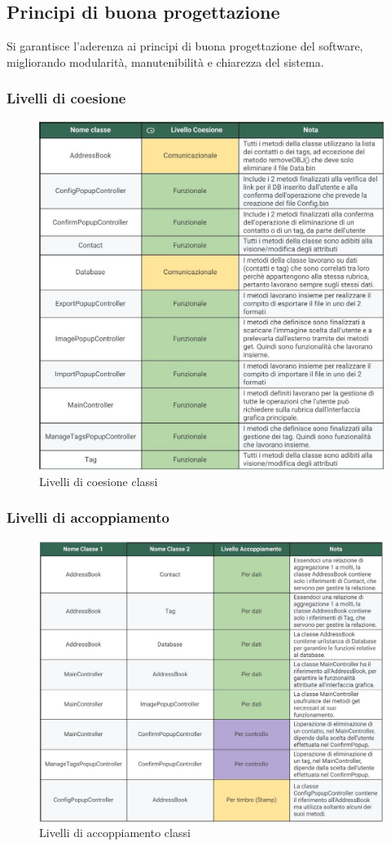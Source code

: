 \newpage
\subsection{Principi di buona progettazione}
Si garantisce l'aderenza ai principi di buona progettazione del software, migliorando modularità, manutenibilità e chiarezza del sistema.
\subsubsection{Livelli di coesione}
\begin{figure}[h]
	\centering
	\includegraphics[width=.9\linewidth]{images/Coesione classi.jpg}
	\caption{Livelli di coesione classi}
	\label{fig:livelli di coesione classi}
\end{figure}
\newpage
\subsubsection{Livelli di accoppiamento}
\begin{figure}[h]
	\centering
	\includegraphics[width=.9\linewidth]{images/Accoppiamento_classi.jpg}
	\caption{Livelli di accoppiamento classi}
	\label{fig:livelli di accoppiamento classi}
\end{figure}

